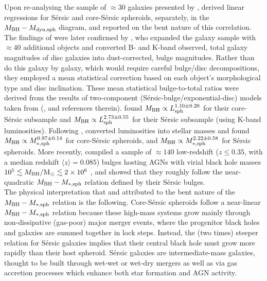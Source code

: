 Upon re-analysing the sample of $\approx 30$ galaxies presented by \cite{haringrix2004}, 
\cite{graham2012bent} derived linear regressions for S\'ersic and core-S\'ersic spheroids, separately, 
in the $M_{\rm BH} - M_{\rm dyn,sph}$ diagram, 
and reported on the bent nature of this correlation. 
The findings of \cite{graham2012bent} were later confirmed by \cite{grahamscott2013}, 
who expanded the galaxy sample with $\approx 40$ additional objects and  
converted B- and K-band observed, total galaxy magnitudes of disc galaxies into dust-corrected, bulge magnitudes. 
Rather than do this galaxy by galaxy, which would require careful bulge/disc decompositions, 
they employed a mean statistical correction based on each object's morphological type and disc inclination. 
These mean statistical bulge-to-total ratios were derived from the results of two-component 
(S\'ersic-bulge/exponential-disc) models 
taken from \citeauthor{grahamworley2008} (\citeyear{grahamworley2008}, and references therein).  
\cite{grahamscott2013} found $M_{\rm BH} \propto L_{\rm sph}^{1.10 \pm 0.20}$ for their core-S\'ersic subsample
and $M_{\rm BH} \propto L_{\rm sph}^{2.73 \pm 0.55}$ for their S\'ersic subsample (using K-band luminosities). 
Following \cite{grahamscott2013}, 
\cite{scott2013} converted luminosities into stellar masses and 
found $M_{\rm BH} \propto M_{\rm *,sph}^{0.97 \pm 0.14}$ for core-S\'ersic spheroids,
and $M_{\rm BH} \propto M_{\rm *,sph}^{2.22 \pm 0.58}$ for S\'ersic spheroids. 
More recently, \cite{grahamscott2015} compiled a sample of $\approx 140$ low-redshift ($z \leq 0.35$, 
with a median redshift $\langle z \rangle = 0.085$) 
bulges hosting AGNs with virial black hole masses 
$10^5 \lesssim M_{\rm BH}/{\rm M_\odot} \lesssim 2 \times 10^6$ \citep{jiang2011a}, 
and showed that they roughly follow the near-quadratic $M_{\rm BH} - M_{\rm *,sph}$ relation defined by their S\'ersic bulges. \\

The physical interpretation that \cite{grahamscott2013} and \cite{scott2013} attributed 
to the bent nature of the $M_{\rm BH} - M_{\rm *,sph}$ relation is the following. 
Core-S\'ersic spheroids follow a near-linear $M_{\rm BH} - M_{\rm *,sph}$ relation 
because these high-mass systems grow mainly through non-dissipative (gas-poor) major merger events, 
where the progenitor black holes and galaxies are summed together in lock steps.
Instead, the (two times) steeper relation for S\'ersic galaxies implies that 
their central black hole must grow more rapidly than their host spheroid. 
S\'ersic galaxies are intermediate-mass galaxies, thought to be built through wet-wet or wet-dry mergers as well as
via gas accretion processes which enhance both star formation and AGN activity. \\

